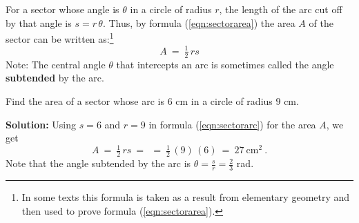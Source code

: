 For a sector whose angle is $\theta$ in a circle of radius $r$, the length of the arc cut off by
that angle is $s=r\,\theta$. Thus, by formula (\ref{eqn:sectorarea}) the area $A$ of the sector
can be written as:\footnote{In some texts this formula is taken as a result from elementary geometry
and then used to prove formula (\ref{eqn:sectorarea}).}
\begin{equation}
 \boxed{ A ~=~ \tfrac{1}{2}\,rs}\label{eqn:sectorarc}
\end{equation}
Note: The central angle $\theta$ that intercepts an arc is sometimes called the angle
\textbf{subtended} by the arc.
\newpage
\begin{exmp}
 Find the area of a sector whose arc is $6$ cm in a circle of radius $9$ cm.\vspace{1mm}
 \par\noindent\textbf{Solution:} Using $s=6$ and $r=9$ in formula (\ref{eqn:sectorarc}) for the area
 $A$, we get
 \begin{displaymath}
  A ~=~ \tfrac{1}{2}\,rs ~=~ ~=~ \tfrac{1}{2}\,(9)\,(6) ~=~ \boxed{27~\text{cm}^2} ~.
 \end{displaymath}
 Note that the angle subtended by the arc is $\theta = \frac{s}{r} = \frac{2}{3}$ rad.
\end{exmp}
